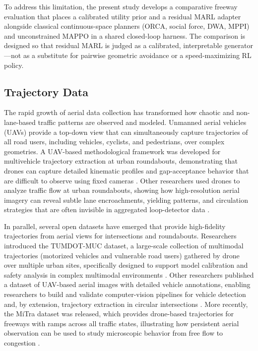 \documentclass[conference]{IEEEtran}
\begin{document}
To address this limitation, the present study develops a comparative freeway evaluation that places a calibrated utility prior and a residual MARL adapter alongside classical continuous-space planners (ORCA, social force, DWA, MPPI) and unconstrained MAPPO in a shared closed-loop harness. The comparison is designed so that residual MARL is judged as a calibrated, interpretable generator---not as a substitute for pairwise geometric avoidance or a speed-maximizing RL policy.

\subsection{Trajectory Data}
The rapid growth of aerial data collection has transformed how chaotic and non-lane-based traffic patterns are observed and modeled. Unmanned aerial vehicles (UAVs) provide a top-down view that can simultaneously capture trajectories of all road users, including vehicles, cyclists, and pedestrians, over complex geometries. A UAV-based methodological framework was developed for multivehicle trajectory extraction at urban roundabouts, demonstrating that drones can capture detailed kinematic profiles and gap-acceptance behavior that are difficult to observe using fixed cameras \cite{khan2018uav}. Other researchers used drones to analyze traffic flow at urban roundabouts, showing how high-resolution aerial imagery can reveal subtle lane encroachments, yielding patterns, and circulation strategies that are often invisible in aggregated loop-detector data \cite{brahimi2020drones}.

In parallel, several open datasets have emerged that provide high-fidelity trajectories from aerial views for intersections and roundabouts. Researchers introduced the TUMDOT-MUC dataset, a large-scale collection of multimodal trajectories (motorized vehicles and vulnerable road users) gathered by drone over multiple urban sites, specifically designed to support model calibration and safety analysis in complex multimodal environments \cite{kutsch2024tumdot}. Other researchers published a dataset of UAV-based aerial images with detailed vehicle annotations, enabling researchers to build and validate computer-vision pipelines for vehicle detection and, by extension, trajectory extraction in circular intersections \cite{puertas2022roundabout}. More recently, the MiTra dataset was released, which provides drone-based trajectories for freeways with ramps across all traffic states, illustrating how persistent aerial observation can be used to study microscopic behavior from free flow to congestion \cite{chaudhari2025mitra}.
\end{document}
